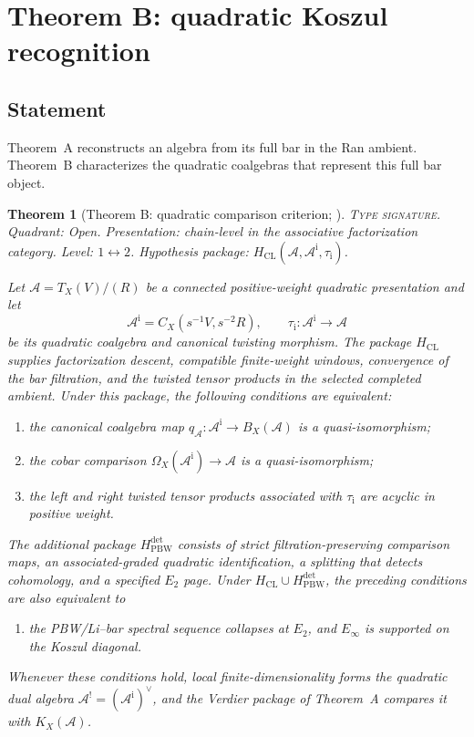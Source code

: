 \documentclass[11pt]{article}
\theoremstyle{plain}
\newtheorem{theorem}{Theorem}[section]
\theoremstyle{definition}
\theoremstyle{remark}
\newcommand{\cA}{\mathcal{A}}
\begin{document}
\section{Theorem B: quadratic Koszul recognition}
\label{sec:theorem-B}

\subsection{Statement}

Theorem~A reconstructs an algebra from its full bar in the Ran
ambient.  Theorem~B characterizes the quadratic coalgebras that
represent this full bar object.

\begin{theorem}[Theorem B: quadratic comparison criterion;
\ClaimStatusConditional]
\label{thm:bar-cobar-inversion}
\textsc{Type signature.} Quadrant: Open. Presentation: chain-level
in the associative factorization category. Level: $1\leftrightarrow2$.
Hypothesis package: $H_{\mathrm{CL}}(\cA,\cA^{\mathrm i},\tau_{\mathrm i})$.

Let $\cA=T_X(V)/(R)$ be a connected positive-weight quadratic
presentation and let
\[
 \cA^{\mathrm i}=C_X(s^{-1}V,s^{-2}R),
 \qquad
 \tau_{\mathrm i}\colon\cA^{\mathrm i}\longrightarrow\cA
\]
be its quadratic coalgebra and canonical twisting morphism.  The
package $H_{\mathrm{CL}}$ supplies factorization descent, compatible
finite-weight windows, convergence of the bar filtration, and the
twisted tensor products in the selected completed ambient.  Under
this package, the following conditions are equivalent:
\begin{enumerate}[label=\textup{(B\arabic*)}]
\item the canonical coalgebra map
$q_\cA\colon\cA^{\mathrm i}\to B_X(\cA)$ is a quasi-isomorphism;
\item the cobar comparison
$\Omega_X(\cA^{\mathrm i})\to\cA$ is a quasi-isomorphism;
\item the left and right twisted tensor products associated with
$\tau_{\mathrm i}$ are acyclic in positive weight.
\end{enumerate}
The additional package $H_{\mathrm{PBW}}^{\mathrm{det}}$ consists of
strict filtration-preserving comparison maps, an associated-graded
quadratic identification, a splitting that detects cohomology, and a
specified $E_2$ page.  Under
$H_{\mathrm{CL}}\cup H_{\mathrm{PBW}}^{\mathrm{det}}$, the preceding
conditions are also equivalent to
\begin{enumerate}[label=\textup{(B4)}]
\item the PBW/Li--bar spectral sequence collapses at $E_2$, and
$E_\infty$ is supported on the Koszul diagonal.
\end{enumerate}
Whenever these conditions hold, local finite-dimensionality forms
the quadratic dual algebra
$\cA^!=(\cA^{\mathrm i})^\vee$, and the Verdier package of
Theorem~A compares it with $K_X(\cA)$.
\end{theorem}
\end{document}

